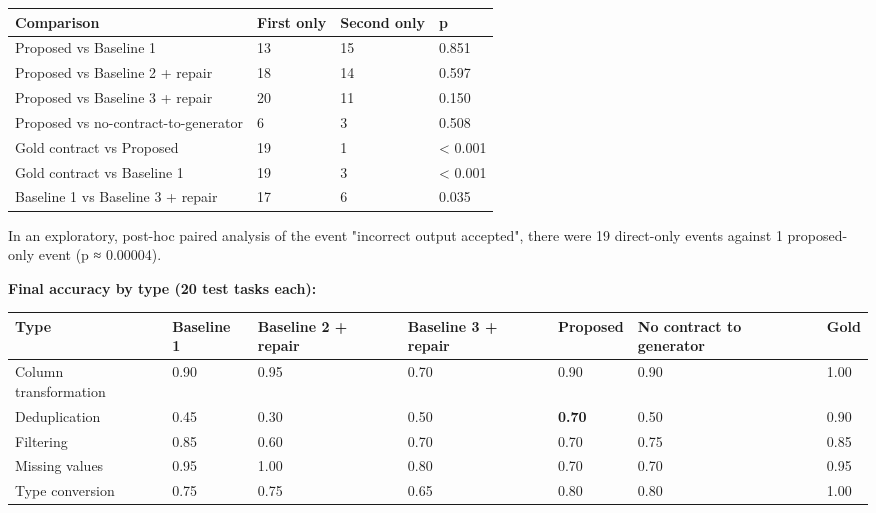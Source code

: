 \documentclass[11pt]{article}
\begin{document}
\begin{table}[!tp]
\centering\footnotesize\setlength{\tabcolsep}{3pt}\renewcommand{\arraystretch}{1.1}
\begin{tabularx}{\textwidth}{>{\raggedright\arraybackslash}Xlll}
\toprule
\textbf{Comparison} & \textbf{First only} & \textbf{Second only} & \textbf{p} \\
\midrule
Proposed vs Baseline 1 & 13 & 15 & 0.851 \\
Proposed vs Baseline 2 + repair & 18 & 14 & 0.597 \\
Proposed vs Baseline 3 + repair & 20 & 11 & 0.150 \\
Proposed vs no-contract-to-generator & 6 & 3 & 0.508 \\
Gold contract vs Proposed & 19 & 1 & < 0.001 \\
Gold contract vs Baseline 1 & 19 & 3 & < 0.001 \\
Baseline 1 vs Baseline 3 + repair & 17 & 6 & 0.035 \\
\bottomrule
\end{tabularx}
\end{table}

In an exploratory, post-hoc paired analysis of the event "incorrect
output accepted", there were 19 direct-only events against 1
proposed-only event (p ≈ 0.00004).

\textbf{Final accuracy by type (20 test tasks each):}

\begin{table}[!tp]
\centering\footnotesize\setlength{\tabcolsep}{3pt}\renewcommand{\arraystretch}{1.1}
\begin{adjustbox}{max width=\textwidth}\begin{tabular}{lllllll}
\toprule
\textbf{Type} & \textbf{Baseline 1} & \textbf{Baseline 2 + repair} & \textbf{Baseline 3 + repair} & \textbf{Proposed} & \textbf{No contract to generator} & \textbf{Gold} \\
\midrule
Column transformation & 0.90 & 0.95 & 0.70 & 0.90 & 0.90 & 1.00 \\
Deduplication & 0.45 & 0.30 & 0.50 & \textbf{0.70} & 0.50 & 0.90 \\
Filtering & 0.85 & 0.60 & 0.70 & 0.70 & 0.75 & 0.85 \\
Missing values & 0.95 & 1.00 & 0.80 & 0.70 & 0.70 & 0.95 \\
Type conversion & 0.75 & 0.75 & 0.65 & 0.80 & 0.80 & 1.00 \\
\bottomrule
\end{tabular}\end{adjustbox}
\end{table}
\end{document}
